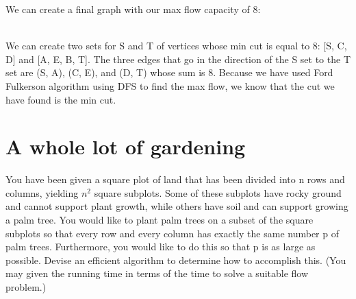 \documentclass[11pt, solution, letterpaper]{format}
\begin{document}
We can create a final graph with our max flow capacity of 8:\\
\\

We can create two sets for S and T of vertices whose min cut is equal to 8: [S, C, D] and [A, E, B, T]. The three edges that go in the direction of the S set to the T set are (S, A), (C, E), and (D, T) whose sum is 8. Because we have used Ford Fulkerson algorithm using DFS to find the max flow, we know that the cut we have found is the min cut.


\clearpage
\section{A whole lot of gardening}
You have been given a square plot of land that has been divided into n rows and columns, yielding $n^2$ square subplots. Some of these subplots have rocky ground and cannot support plant growth, while others have soil and can support growing a palm tree. You would like to plant palm trees on a subset of the square subplots so that every row and every column has exactly the same number p of palm trees. Furthermore, you would like to do this so that p is as large as possible. Devise an efficient algorithm to determine how to accomplish this. (You may given the running time in terms of the time to solve a suitable flow problem.)\\
\end{document}
